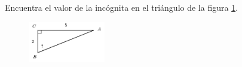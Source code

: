 \question[15]  Encuentra el valor de la incógnita en el triángulo de la figura \ref{fig:angle_functrig_22}.
\begin{figure}[H]
    \begin{center}
        \includegraphics[width=0.3\textwidth]{../images/angle_functrig_22.png}
    \end{center}
    \caption{}
    \label{fig:angle_functrig_22}
\end{figure}